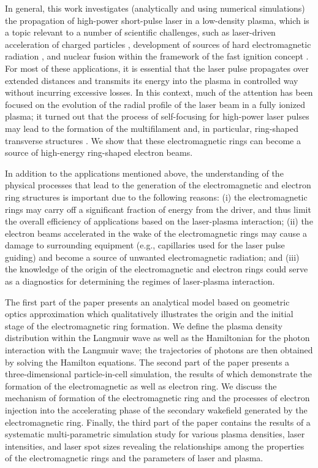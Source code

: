 \documentclass[10pt, a4paper, twoside, openright]{report}
\begin{document}
In general, this work investigates (analytically and using numerical simulations) the propagation of high-power short-pulse laser in a low-density plasma, which is a topic relevant to a number of scientific challenges, such as laser-driven acceleration of charged particles \cite{Tajima1979, Esarey2009, Gonsalves2019}, development of sources of hard electromagnetic radiation \cite{Pirozhkov2012, Bulanov2013}, and nuclear fusion within the framework of the fast ignition concept \cite{Tabak1994}. For most of these applications, it is essential that the laser pulse propagates over extended distances and transmits its energy into the plasma in controlled way without incurring excessive losses. In this context, much of the attention has been focused on the evolution of the radial profile of the laser beam in a fully ionized plasma; it turned out that the process of self-focusing for high-power laser pulses may lead to the formation of the multifilament and, in particular, ring-shaped transverse structures \cite{Mori1988, Cohen1991, Borisov1992, Krushelnick1997, Cattani2001, Kim2002, Naseri2016, Kovalev2019}. We show that these electromagnetic rings can become a source of high-energy ring-shaped electron beams. 

In addition to the applications mentioned above, the understanding of the physical processes that lead to the generation of the electromagnetic and electron ring structures is important due to the following reasons: (i) the electromagnetic rings may carry off a significant fraction of energy from the driver, and thus limit the overall efficiency of applications based on the laser-plasma interaction; (ii) the electron beams accelerated in the wake of the electromagnetic rings may cause a damage to surrounding equipment (e.g., capillaries used for the laser pulse guiding) and become a source of unwanted electromagnetic radiation; and (iii) the knowledge of the origin of the electromagnetic and electron rings could serve as a diagnostics for determining the regimes of laser-plasma interaction.

The first part of the paper presents an analytical model based on geometric optics approximation which qualitatively illustrates the origin and the initial stage of the electromagnetic ring formation. We define the plasma density distribution within the Langmuir wave as well as the Hamiltonian for the photon interaction with the Langmuir wave; the trajectories of photons are then obtained by solving the Hamilton equations. The second part of the paper presents a three-dimensional particle-in-cell simulation, the results of which demonstrate the formation of the electromagnetic as well as electron ring. We discuss the mechanism of formation of the electromagnetic ring and the processes of electron injection into the accelerating phase of the secondary wakefield generated by the electromagnetic ring. Finally, the third part of the paper contains the results of a systematic multi-parametric simulation study for various plasma densities, laser intensities, and laser spot sizes revealing the relationships among the properties of the electromagnetic rings and the parameters of laser and plasma.
\end{document}
